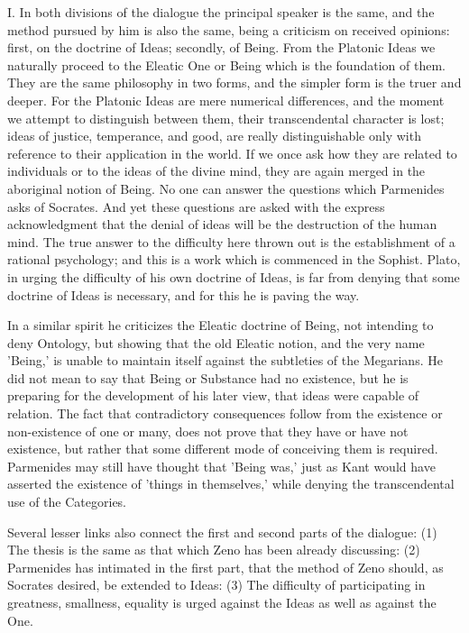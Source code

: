 I. In both divisions of the dialogue the principal speaker is the same,
and the method pursued by him is also the same, being a criticism on
received opinions: first, on the doctrine of Ideas; secondly, of Being.
From the Platonic Ideas we naturally proceed to the Eleatic One or Being
which is the foundation of them. They are the same philosophy in two
forms, and the simpler form is the truer and deeper. For the Platonic
Ideas are mere numerical differences, and the moment we attempt to
distinguish between them, their transcendental character is lost; ideas
of justice, temperance, and good, are really distinguishable only with
reference to their application in the world. If we once ask how they
are related to individuals or to the ideas of the divine mind, they are
again merged in the aboriginal notion of Being. No one can answer the
questions which Parmenides asks of Socrates. And yet these questions are
asked with the express acknowledgment that the denial of ideas will be
the destruction of the human mind. The true answer to the difficulty
here thrown out is the establishment of a rational psychology; and
this is a work which is commenced in the Sophist. Plato, in urging the
difficulty of his own doctrine of Ideas, is far from denying that some
doctrine of Ideas is necessary, and for this he is paving the way.

In a similar spirit he criticizes the Eleatic doctrine of Being, not
intending to deny Ontology, but showing that the old Eleatic notion,
and the very name 'Being,' is unable to maintain itself against the
subtleties of the Megarians. He did not mean to say that Being or
Substance had no existence, but he is preparing for the development
of his later view, that ideas were capable of relation. The fact that
contradictory consequences follow from the existence or non-existence
of one or many, does not prove that they have or have not existence,
but rather that some different mode of conceiving them is required.
Parmenides may still have thought that 'Being was,' just as Kant would
have asserted the existence of 'things in themselves,' while denying the
transcendental use of the Categories.

Several lesser links also connect the first and second parts of the
dialogue: (1) The thesis is the same as that which Zeno has been already
discussing: (2) Parmenides has intimated in the first part, that the
method of Zeno should, as Socrates desired, be extended to Ideas: (3)
The difficulty of participating in greatness, smallness, equality is
urged against the Ideas as well as against the One.


